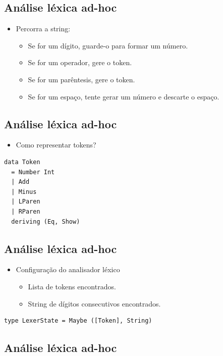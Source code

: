 \documentclass[11pt]{article}
\begin{document}
\subsection*{Análise léxica ad-hoc}
\label{sec:org0240f5c}

\begin{itemize}
\item Percorra a string:
\begin{itemize}
\item Se for um dígito, guarde-o para formar um número.
\item Se for um operador, gere o token.
\item Se for um parêntesis, gere o token.
\item Se for um espaço, tente gerar um número e descarte o espaço.
\end{itemize}
\end{itemize}
\subsection*{Análise léxica ad-hoc}
\label{sec:org94f1434}

\begin{itemize}
\item Como representar tokens?
\end{itemize}

\begin{verbatim}
data Token
  = Number Int
  | Add
  | Minus
  | LParen
  | RParen
  deriving (Eq, Show)
\end{verbatim}
\subsection*{Análise léxica ad-hoc}
\label{sec:orgac0f8de}

\begin{itemize}
\item Configuração do analisador léxico
\begin{itemize}
\item Lista de tokens encontrados.
\item String de dígitos consecutivos encontrados.
\end{itemize}
\end{itemize}

\begin{verbatim}
type LexerState = Maybe ([Token], String)
\end{verbatim}
\subsection*{Análise léxica ad-hoc}
\label{sec:org523ae11}
\end{document}
